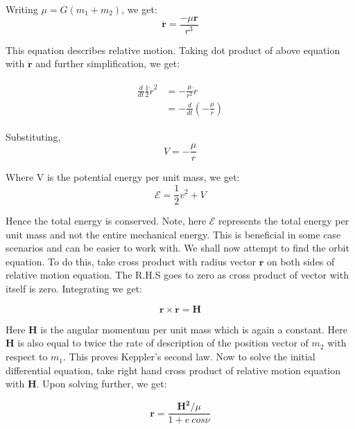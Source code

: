 \documentclass[12pt, letterpaper]{article}
\begin{document}
Writing $\mu = G(m_1+m_2)$, we get:
\begin{displaymath}
\mathbf{\ddot{r}}  = \frac{-\mu\mathbf{r}}{r^3}
\end{displaymath}

This equation describes relative motion. Taking dot product of above equation with $\mathbf{\dot{r}}$ and further simplification, we get:

\begin{gather*}
\begin{split}
\frac{d}{dt}\frac{1}{2}\dot{r}^2 & = - \frac{\mu}{r^2}\dot{r}\\
								& = - \frac{d}{dt}\left(-\frac{\mu}{r}\right)
\end{split}
\end{gather*}

Substituting,
\begin{displaymath}
V = -\frac{\mu}{r}
\end{displaymath}

Where V is the potential energy per unit mass, we get:
\begin{displaymath}
\mathcal{E} = \frac{1}{2}v^2 + V
\end{displaymath}

Hence the total energy is conserved. Note, here $\mathcal{E}$ represents the total energy per unit mass and not the entire mechanical energy. This is beneficial in some case scenarios and can be easier to work with. We shall now attempt to find the orbit equation. To do this, take cross product with radius vector $\mathbf{r}$ on both sides of relative motion equation. The R.H.S goes to zero as cross product of vector with itself is zero. Integrating we get:

\begin{displaymath}
\mathbf{r}\times\mathbf{\dot{r}} = \mathbf{H}
\end{displaymath}

Here \textbf{H} is the angular momentum per unit mass which is again a constant. Here \textbf{H} is also equal to twice the rate of description of the position vector of $m_2$ with respect to $m_1$. This proves Keppler's second law. Now to solve the initial differential equation, take right hand cross product of relative motion equation with \textbf{H}. Upon solving further, we get:

\begin{displaymath}
\mathbf{r} = \frac{\mathbf{H^2}/\mu}{1 + e\:cos\nu}
\end{displaymath}
\end{document}
